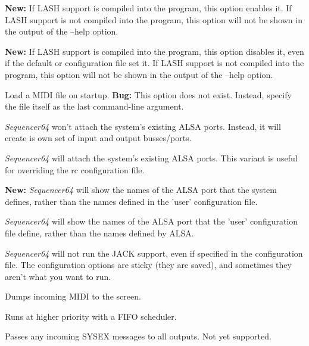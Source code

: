       \textbf{New:}
      If LASH support is compiled into the program, this option
      enables it.
      If LASH support is not compiled into the program, this option will not
      be shown in the output of the --help option.

      \textbf{New:}
      If LASH support is compiled into the program, this option
      disables it, even if the default or configuration file set it.
      If LASH support is not compiled into the program, this option will not
      be shown in the output of the --help option.

      Load a MIDI file on startup.
      \textbf{Bug:}
      This option does not exist.
      Instead, specify the file itself as the last command-line argument.

      \textsl{Sequencer64} won't attach the system's existing ALSA ports.
      Instead, it will create is own set of input and output busses/ports.

      \textsl{Sequencer64} will attach the system's existing ALSA ports.
      This variant is useful for overriding the rc configuration file.

      \textbf{New:}
      \textsl{Sequencer64} will show the names of the ALSA port that the system
      defines, rather than the names defined in the 'user' configuration file.

      \textsl{Sequencer64} will show the names of the ALSA port that the 'user'
      configuration file define, rather than the names defined by ALSA.

      \textsl{Sequencer64} will not run the JACK support, even if specified
      in the configuration file.  The configuration options are sticky (they
      are saved), and sometimes they aren't what you want to run.

      Dumps incoming MIDI to the screen.

      Runs at higher priority with a FIFO scheduler.

      Passes any incoming SYSEX messages to all outputs.
		Not yet supported.

